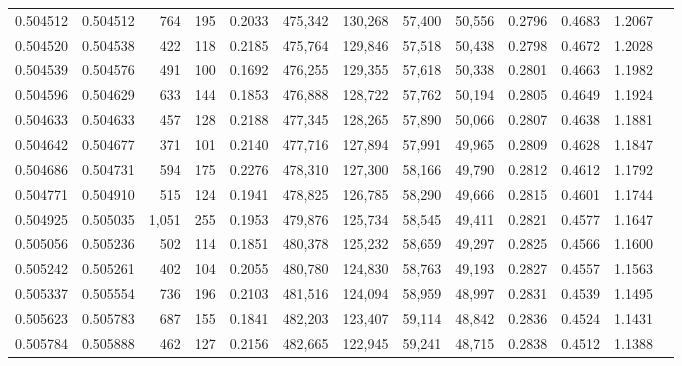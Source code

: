 \begin{tabular}{rrrrrrrrrrrrr}
0.504512 & 0.504512 &   764 &   195 &                                     0.2033 & 475,342 & 130,268 &  57,400 &  50,556 & 0.2796 & 0.4683 & 1.2067 \\
0.504520 & 0.504538 &   422 &   118 &                                     0.2185 & 475,764 & 129,846 &  57,518 &  50,438 & 0.2798 & 0.4672 & 1.2028 \\
0.504539 & 0.504576 &   491 &   100 &                                     0.1692 & 476,255 & 129,355 &  57,618 &  50,338 & 0.2801 & 0.4663 & 1.1982 \\
0.504596 & 0.504629 &   633 &   144 &                                     0.1853 & 476,888 & 128,722 &  57,762 &  50,194 & 0.2805 & 0.4649 & 1.1924 \\
0.504633 & 0.504633 &   457 &   128 &                                     0.2188 & 477,345 & 128,265 &  57,890 &  50,066 & 0.2807 & 0.4638 & 1.1881 \\
0.504642 & 0.504677 &   371 &   101 &                                     0.2140 & 477,716 & 127,894 &  57,991 &  49,965 & 0.2809 & 0.4628 & 1.1847 \\
0.504686 & 0.504731 &   594 &   175 &                                     0.2276 & 478,310 & 127,300 &  58,166 &  49,790 & 0.2812 & 0.4612 & 1.1792 \\
0.504771 & 0.504910 &   515 &   124 &                                     0.1941 & 478,825 & 126,785 &  58,290 &  49,666 & 0.2815 & 0.4601 & 1.1744 \\
0.504925 & 0.505035 & 1,051 &   255 &                                     0.1953 & 479,876 & 125,734 &  58,545 &  49,411 & 0.2821 & 0.4577 & 1.1647 \\
0.505056 & 0.505236 &   502 &   114 &                                     0.1851 & 480,378 & 125,232 &  58,659 &  49,297 & 0.2825 & 0.4566 & 1.1600 \\
0.505242 & 0.505261 &   402 &   104 &                                     0.2055 & 480,780 & 124,830 &  58,763 &  49,193 & 0.2827 & 0.4557 & 1.1563 \\
0.505337 & 0.505554 &   736 &   196 &                                     0.2103 & 481,516 & 124,094 &  58,959 &  48,997 & 0.2831 & 0.4539 & 1.1495 \\
0.505623 & 0.505783 &   687 &   155 &                                     0.1841 & 482,203 & 123,407 &  59,114 &  48,842 & 0.2836 & 0.4524 & 1.1431 \\
0.505784 & 0.505888 &   462 &   127 &                                     0.2156 & 482,665 & 122,945 &  59,241 &  48,715 & 0.2838 & 0.4512 & 1.1388 \\

\end{tabular}
